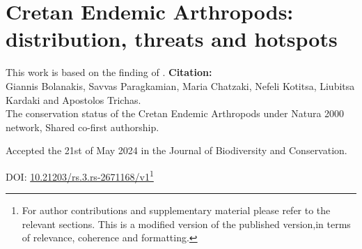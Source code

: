 % 
% 


\chapter{Cretan Endemic Arthropods: distribution, threats and hotspots}
\label{cha:arthropods}


This work is based on the finding of \textcite{bolanakis2024}.
\textbf{Citation:} \\ 
Giannis Bolanakis, Savvas Paragkamian, Maria Chatzaki, Nefeli Kotitsa, Liubitsa Kardaki and Apostolos Trichas.\\
The conservation status of the Cretan Endemic Arthropods under Natura 2000 network,
Shared co-first authorship.

Accepted the 21st of May 2024 in the Journal of Biodiversity and Conservation.

DOI: \href{https://doi.org/10.21203/rs.3.rs-2671168/v1}{10.21203/rs.3.rs-2671168/v1}\footnote{
   For author contributions and supplementary material please refer to the relevant sections. 
   This is a modified version of the published version,in terms of relevance, coherence and formatting.}


%
%

